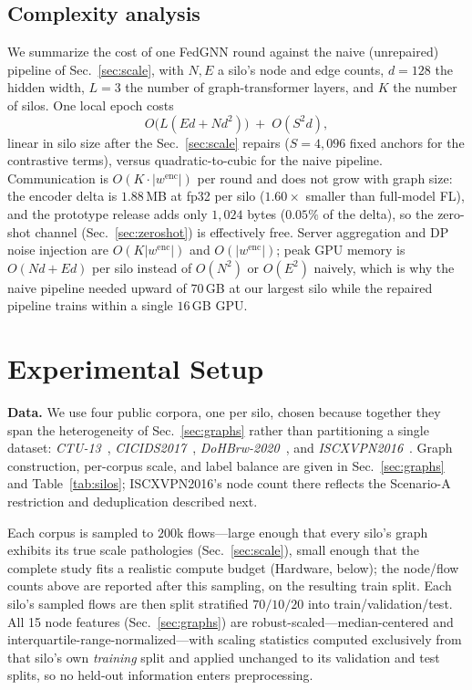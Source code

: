 \documentclass[journal]{IEEEtran}
\begin{document}
\subsection{Complexity analysis}
\label{sec:complexity}
We summarize the cost of one FedGNN round against the naive
(unrepaired) pipeline of Sec.~\ref{sec:scale}, with $N, E$ a silo's
node and edge counts, $d{=}128$ the hidden width, $L{=}3$ the number of
graph-transformer layers, and $K$ the number of silos. One local epoch
costs
\begin{equation}
O\big(L(Ed + Nd^{2})\big) \;+\; O(S^{2}d),
\label{eq:localcomplexity}
\end{equation}
linear in silo size after the Sec.~\ref{sec:scale} repairs ($S{=}4{,}096$
fixed anchors for the contrastive terms), versus quadratic-to-cubic for
the naive pipeline. Communication is $O(K \cdot |w^{\mathrm{enc}}|)$
per round and does not grow with graph size: the encoder delta is
$1.88$\,MB at fp32 per silo ($1.60\times$ smaller than full-model FL),
and the prototype release adds only $1{,}024$ bytes ($0.05\%$ of the
delta), so the zero-shot channel (Sec.~\ref{sec:zeroshot}) is
effectively free. Server aggregation and DP noise injection are
$O(K|w^{\mathrm{enc}}|)$ and $O(|w^{\mathrm{enc}}|)$; peak GPU memory
is $O(Nd+Ed)$ per silo instead of $O(N^{2})$ or $O(E^{2})$ naively,
which is why the naive pipeline needed upward of $70$\,GB at our
largest silo while the repaired pipeline trains within a single
$16$\,GB GPU.

\section{Experimental Setup}
\label{sec:setup}

\textbf{Data.} We use four public corpora, one per silo, chosen
because together they span the heterogeneity of Sec.~\ref{sec:graphs}
rather than partitioning a single dataset: \emph{CTU-13}~\cite{ctu13},
\emph{CICIDS2017}~\cite{cicids}, \emph{DoHBrw-2020}~\cite{dohbrw}, and
\emph{ISCXVPN2016}~\cite{iscxvpn}. Graph construction, per-corpus scale,
and label balance are given in Sec.~\ref{sec:graphs} and
Table~\ref{tab:silos}; ISCXVPN2016's node count there reflects the
Scenario-A restriction and deduplication described next.

Each corpus is sampled to $200$k flows---large enough that every
silo's graph exhibits its true scale pathologies (Sec.~\ref{sec:scale}),
small enough that the complete study fits a realistic compute budget
(Hardware, below); the node/flow counts above are reported after this
sampling, on the resulting train split. Each silo's sampled flows are
then split stratified $70/10/20$ into train/validation/test. All 15
node features (Sec.~\ref{sec:graphs}) are robust-scaled---median-centered
and interquartile-range-normalized---with scaling statistics computed
exclusively from that silo's own \emph{training} split and applied
unchanged to its validation and test splits, so no held-out
information enters preprocessing.
\end{document}
